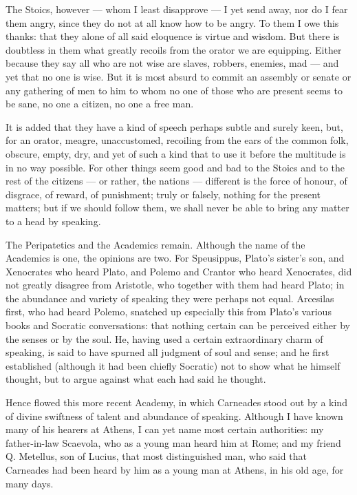  The Stoics, however — whom I least disapprove — I yet send away, nor do I fear them angry, since they do not at all know how to be angry. To them I owe this thanks: that they alone of all said eloquence is virtue and wisdom. But there is doubtless in them what greatly recoils from the orator we are equipping. Either because they say all who are not wise are slaves, robbers, enemies, mad — and yet that no one is wise. But it is most absurd to commit an assembly or senate or any gathering of men to him to whom no one of those who are present seems to be sane, no one a citizen, no one a free man.

 It is added that they have a kind of speech perhaps subtle and surely keen, but, for an orator, meagre, unaccustomed, recoiling from the ears of the common folk, obscure, empty, dry, and yet of such a kind that to use it before the multitude is in no way possible. For other things seem good and bad to the Stoics and to the rest of the citizens — or rather, the nations — different is the force of honour, of disgrace, of reward, of punishment; truly or falsely, nothing for the present matters; but if we should follow them, we shall never be able to bring any matter to a head by speaking.

 The Peripatetics and the Academics remain. Although the name of the Academics is one, the opinions are two. For Speusippus, Plato's sister's son, and Xenocrates who heard Plato, and Polemo and Crantor who heard Xenocrates, did not greatly disagree from Aristotle, who together with them had heard Plato; in the abundance and variety of speaking they were perhaps not equal. Arcesilas first, who had heard Polemo, snatched up especially this from Plato's various books and Socratic conversations: that nothing certain can be perceived either by the senses or by the soul. He, having used a certain extraordinary charm of speaking, is said to have spurned all judgment of soul and sense; and he first established (although it had been chiefly Socratic) not to show what he himself thought, but to argue against what each had said he thought.

 Hence flowed this more recent Academy, in which Carneades stood out by a kind of divine swiftness of talent and abundance of speaking. Although I have known many of his hearers at Athens, I can yet name most certain authorities: my father-in-law Scaevola, who as a young man heard him at Rome; and my friend Q. Metellus, son of Lucius, that most distinguished man, who said that Carneades had been heard by him as a young man at Athens, in his old age, for many days.

